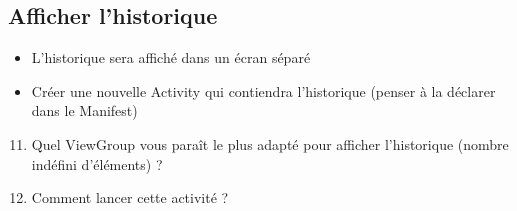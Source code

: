 \documentclass{article}
\begin{document}
\subsection{Afficher l'historique}
\begin{itemize}
\item L'historique sera affiché dans un écran séparé
\item Créer une nouvelle Activity qui contiendra l'historique (penser à la déclarer dans le Manifest)
\end{itemize}
\begin{enumerate}
 \setcounter{enumi}{10}
\item Quel ViewGroup vous paraît le plus adapté pour afficher l'historique (nombre indéfini d'éléments) ?
\item Comment lancer cette activité ?
\end{enumerate}
\end{document}
